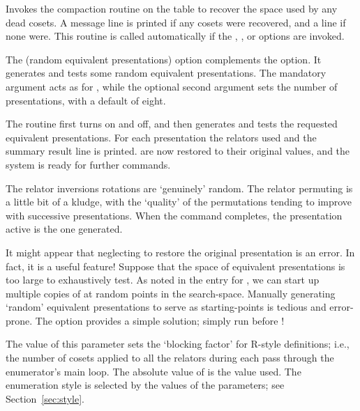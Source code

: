 \quad{}

Invokes the compaction routine on the table to recover the space used by
  any dead cosets.
A  message line is printed if any cosets were recovered, and a
   line if none were.
This routine is called automatically if the , , 
  or  options are invoked.

\quad{}

The  (random equivalent presentations) option complements the
   option.
It generates and tests some random equivalent presentations.
The mandatory argument acts as for , while the optional second
  argument sets the number of presentations, with a default of eight.

The routine first turns  on and  off, and then 
  generates and tests the requested equivalent presentations.
For each presentation the relators used and the summary result line is
  printed.
 \amp {} are now restored to their original values, and 
  the system is ready for further commands.

The relator inversions \amp rotations are `genuinely' random.
The relator permuting is a little bit of a kludge, with the `quality' of
  the permutations tending to improve with successive presentations. 
When the  command completes, the presentation active is the 
   one generated.

It might appear that neglecting to restore the original presentation is an
  error.
In fact, it is a useful feature!
Suppose that the space of equivalent presentations is too large to
  exhaustively test.
As noted in the entry for , we can start up multiple copies of
   at random points in the search-space.
Manually generating `random' equivalent presentations to serve as
  starting-points is tedious and error-prone.
The  option provides a simple solution; simply run 
  before !

\quad{}

The value of this parameter sets the `blocking factor' for R-style
  definitions; i.e., the number of cosets applied to all the relators
  during each pass through the enumerator's main loop.
The absolute value of  is the value used.
The enumeration style is selected by the values of the  \amp
   parameters; see Section~\ref{sec:style}.

